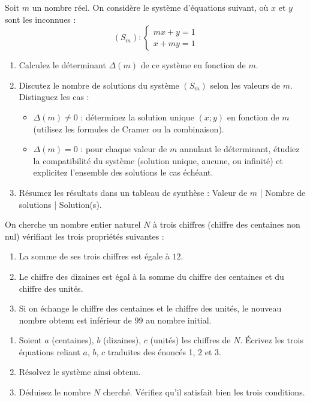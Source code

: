 \documentclass[11pt]{article}
\begin{document}
\begin{exercice}
Soit $m$ un nombre réel. On considère le système d'équations suivant, où $x$ et $y$ sont les inconnues :
\[
(S_m) : \begin{cases}
mx + y = 1 \\
x + my = 1
\end{cases}
\]
\begin{enumerate}
\item Calculez le déterminant $\Delta(m)$ de ce système en fonction de $m$.
\item Discutez le nombre de solutions du système $(S_m)$ selon les valeurs de $m$. Distinguez les cas :
\begin{itemize}
\item $\Delta(m) \neq 0$ : déterminez la solution unique $(x;y)$ en fonction de $m$ (utilisez les formules de Cramer ou la combinaison).
\item $\Delta(m) = 0$ : pour chaque valeur de $m$ annulant le déterminant, étudiez la compatibilité du système (solution unique, aucune, ou infinité) et explicitez l'ensemble des solutions le cas échéant.
\end{itemize}
\item Résumez les résultats dans un tableau de synthèse : Valeur de $m$ | Nombre de solutions | Solution(s).
\end{enumerate}
\end{exercice}

\begin{exercice}
On cherche un nombre entier naturel $N$ à trois chiffres (chiffre des centaines non nul) vérifiant les trois propriétés suivantes :
\begin{enumerate}
\item La somme de ses trois chiffres est égale à $12$.
\item Le chiffre des dizaines est égal à la somme du chiffre des centaines et du chiffre des unités.
\item Si on échange le chiffre des centaines et le chiffre des unités, le nouveau nombre obtenu est inférieur de $99$ au nombre initial.
\end{enumerate}
\begin{enumerate}
\item Soient $a$ (centaines), $b$ (dizaines), $c$ (unités) les chiffres de $N$. Écrivez les trois équations reliant $a$, $b$, $c$ traduites des énoncés 1, 2 et 3.
\item Résolvez le système ainsi obtenu.
\item Déduisez le nombre $N$ cherché. Vérifiez qu'il satisfait bien les trois conditions.
\end{enumerate}
\end{exercice}
\end{document}
